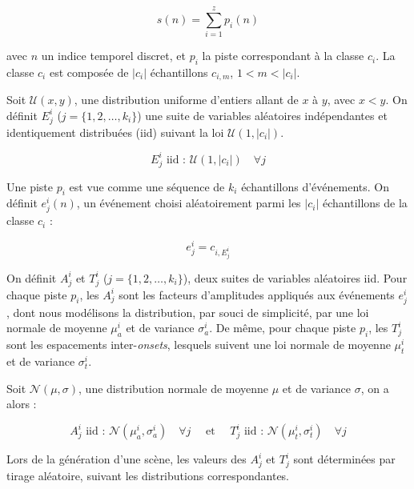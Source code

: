 \begin{equation}
s(n)=\sum_{i=1}^{z}p_i(n)
\end{equation}

avec $n$ un indice temporel discret, et $p_i$ la piste correspondant à la classe $c_i$. La classe $c_i$ est composée de $\vert c_i\vert$ échantillons $c_{i,m}$, $1<m<\vert c_i\vert$.

Soit $\mathcal{U}(x,y)$, une distribution uniforme d'entiers allant de $x$ à $y$, avec $x<y$. On définit $E_j^i$ ($j=\lbrace 1,2,\ldots,k_i\rbrace$) une suite de variables aléatoires indépendantes et identiquement distribuées (iid) suivant la loi $\mathcal{U}(1,\vert c_i \vert)$.

\begin{equation}
E_j^i \textrm{ iid : } \mathcal{U}(1,\vert c_i \vert) \quad \forall j
\end{equation}

Une piste $p_i$ est vue comme une séquence de $k_i$ échantillons d'événements. On définit $e_j^i(n)$, un événement choisi aléatoirement parmi les $\vert c_i\vert$ échantillons de la classe $c_i$ :

\begin{equation}
e_j^i=c_{i,E_j^i}
\end{equation}

On définit $A^i_j$ et $T^i_j$ ($j=\lbrace 1,2,\ldots,k_i\rbrace$), deux suites de variables aléatoires iid. Pour chaque piste $p_i$, les $A^i_j$ sont les facteurs d'amplitudes appliqués aux événements $e_j^i$, dont nous modélisons la distribution, par souci de simplicité, par une loi normale de moyenne $\mu_a^i$ et de variance $\sigma_a^i$. De même, pour chaque piste $p_i$, les $T_j^i$ sont les espacements inter-\emph{onsets}, lesquels suivent une loi normale de moyenne $\mu_t^i$ et de variance $\sigma_t^i$.

Soit $\mathcal{N}(\mu,\sigma)$, une distribution normale de moyenne $\mu$ et de variance $\sigma$, on a alors :

\begin{equation}
\label{eq:ch4_eq1}
A_j^i \textrm{ iid : } \mathcal{N}(\mu_a^{i},\sigma_a^{i}) \quad \forall j \quad \textrm{ et } \quad T_j^i \textrm{ iid : } \mathcal{N}({\mu_t^{i},\sigma_t^{i}}) \quad \forall j
\end{equation}

Lors de la génération d'une scène, les valeurs des $A^i_j$ et $T_j^i$ sont déterminées par tirage aléatoire, suivant les distributions correspondantes.

